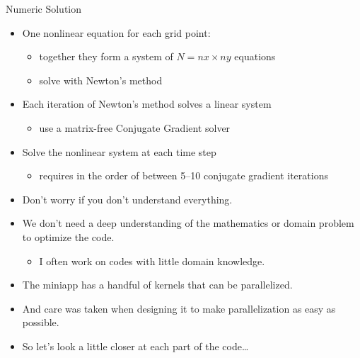\documentclass[aspectratio=43]{beamer}
\begin{document}
\begin{frame}[fragile]{Numeric Solution}
    \begin{itemize}
        \item One nonlinear equation for each grid point:
        \begin{itemize}
            \item together they form a system of $N=nx \times ny$ equations
            \item solve with Newton's method
        \end{itemize}
        \item Each iteration of Newton's method solves a  linear system
        \begin{itemize}
            \item use a matrix-free Conjugate Gradient solver
        \end{itemize}
        \item Solve the nonlinear system at each time step
        \begin{itemize}
            \item requires in the order of between 5--10  conjugate  gradient iterations
        \end{itemize}
    \end{itemize}
\end{frame}

\begin{frame}[fragile]{}
    \begin{itemize}
        \item Don't worry if you don't understand everything.
            \item We don’t need a deep understanding of the  mathematics or domain problem to optimize the  code.
            \begin{itemize}
                \item I often work on codes with little domain knowledge.
            \end{itemize}
            \item The miniapp has a handful of kernels that can be  parallelized.
            \item And care was taken when designing it to make  parallelization as easy as possible.
            \item So let’s look a little closer at each part of the code\dots
    \end{itemize}
\end{frame}
\end{document}
